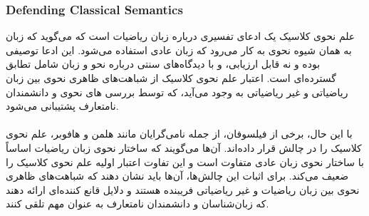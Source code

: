 \documentclass[10pt,a4paper]{article}
\begin{document}
                    \subsubsection{Defending Classical Semantics}
علم نحوی کلاسیک یک ادعای تفسیری درباره زبان ریاضیات است که می‌گوید که زبان به همان شیوه نحوی به کار می‌رود که زبان عادی استفاده می‌شود. این ادعا توصیفی بوده و نه قابل ارزیابی، و با دیدگاه‌های سنتی درباره نحو و زبان شامل تطابق گسترده‌ای است. اعتبار علم نحوی کلاسیک از شباهت‌های ظاهری نحوی بین زبان ریاضیاتی و غیر ریاضیاتی به وجود می‌آید، که توسط بررسی های نحوی و دانشمندان نامتعارف پشتیبانی می‌شود.
                        \\
                        \\
با این حال، برخی از فیلسوفان، از جمله نامی‌گرایان مانند هلمن و هافوبر، علم نحوی کلاسیک را در چالش قرار داده‌اند. آن‌ها می‌گویند که ساختار نحوی زبان ریاضیات اساساً با ساختار نحوی زبان عادی متفاوت است و این تفاوت اعتبار اولیه علم نحوی کلاسیک را ضعیف می‌کند. برای اثبات این چالش‌ها، آن‌ها باید نشان دهند که شباهت‌های ظاهری نحوی بین زبان ریاضیات و غیر ریاضیاتی فریبنده هستند و دلایل قانع کننده‌ای ارائه دهند که زبان‌شناسان و دانشمندان نامتعارف به عنوان مهم تلقی کنند.
\end{document}
